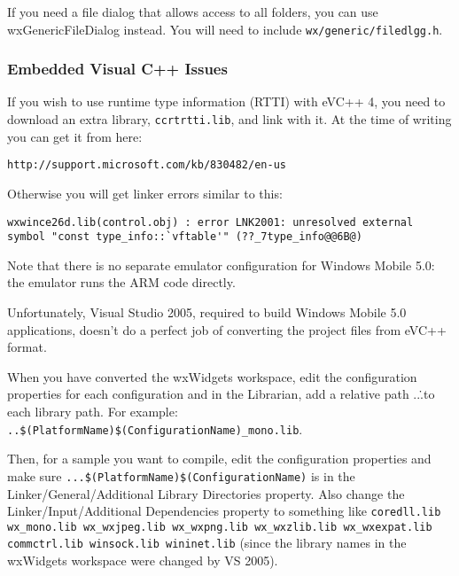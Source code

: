 If you need a file dialog that allows access to all folders,
you can use wxGenericFileDialog instead. You will need to include 
{\tt wx/generic/filedlgg.h}.

\subsubsection{Embedded Visual C++ Issues}


If you wish to use runtime type information (RTTI) with eVC++ 4, you need to download
an extra library, {\tt ccrtrtti.lib}, and link with it. At the time of
writing you can get it from here:

\begin{verbatim}
http://support.microsoft.com/kb/830482/en-us
\end{verbatim}

Otherwise you will get linker errors similar to this:

\begin{verbatim}
wxwince26d.lib(control.obj) : error LNK2001: unresolved external symbol "const type_info::`vftable'" (??_7type_info@@6B@)
\end{verbatim}


Note that there is no separate emulator configuration for Windows Mobile 5.0: the
emulator runs the ARM code directly.


Unfortunately, Visual Studio 2005, required to build Windows Mobile 5.0 applications,
doesn't do a perfect job of converting the project files from eVC++ format.

When you have converted the wxWidgets workspace, edit the configuration properties
for each configuration and in the Librarian, add a relative path ..\..\lib to
each library path. For example: {\tt ..\$(PlatformName)\$(ConfigurationName)\wx_mono.lib}.

Then, for a sample you want to compile, edit the configuration properties
and make sure {\tt ..\..\lib\$(PlatformName)\$(ConfigurationName)} is in the Linker/General/Additional
Library Directories property. Also change the Linker/Input/Additional Dependencies
property to something like {\tt coredll.lib wx\_mono.lib wx\_wxjpeg.lib wx\_wxpng.lib wx\_wxzlib.lib wx\_wxexpat.lib commctrl.lib winsock.lib wininet.lib}
(since the library names in the wxWidgets workspace were changed by VS 2005).

